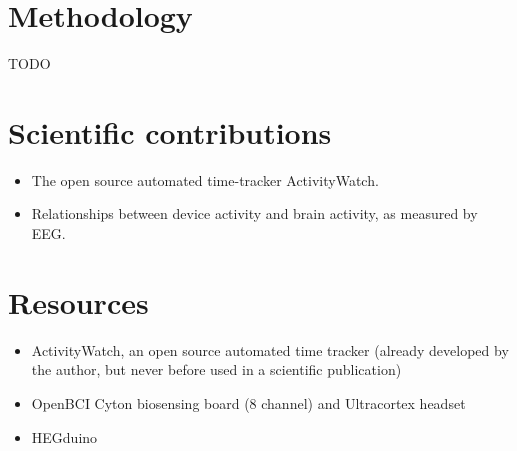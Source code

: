 \documentclass{IEEEtran}
\begin{document}
\section{Methodology}

\large TODO

\section{Scientific contributions}

\begin{itemize}
  \item The open source automated time-tracker ActivityWatch.
  \item Relationships between device activity and brain activity, as measured by EEG\@.
\end{itemize}


\section{Resources}

\begin{itemize}
  \item ActivityWatch, an open source automated time tracker (already developed by the author, but never before used in a scientific publication)
  \item OpenBCI Cyton biosensing board (8 channel) and Ultracortex headset
  \item HEGduino
\end{itemize}

\bibbysegment{}

\nocite{*}
  {\list{}
     {\setlength{\leftmargin}{\bibhang}%
      \setlength{\itemindent}{-\leftmargin}%
      \setlength{\itemsep}{\bibitemsep}%
      \setlength{\parsep}{\bibparsep}}
  }
  {\endlist}
  {\item}
\printbibliography[notcategory=cited, env=bibnonum, heading=notcited]
\end{document}
